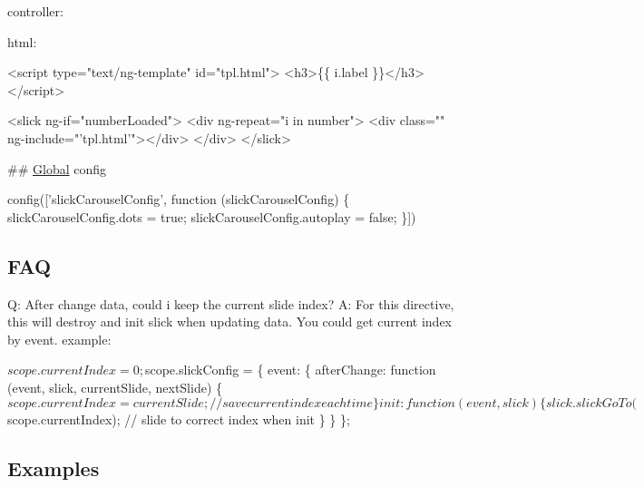 \begin{DoxyItemize}
\item controller\+: 

\item html\+: 
\begin{DoxyCode}
<script type="text/ng-template" id="tpl.html">
    <h3>\{\{ i.label \}\}</h3>
</script>

<slick ng-if="numberLoaded">
    <div ng-repeat="i in number">
        <div class="" ng-include="'tpl.html'"></div>
    </div>
</slick>
\end{DoxyCode}

\end{DoxyItemize}

\#\# \hyperlink{class_global}{Global} config 
\begin{DoxyCode}
config(['slickCarouselConfig', function (slickCarouselConfig) \{
    slickCarouselConfig.dots = true;
    slickCarouselConfig.autoplay = false;
\}])
\end{DoxyCode}


\subsection*{F\+AQ}

Q\+: After change data, could i keep the current slide index? A\+: For this directive, this will destroy and init slick when updating data. You could get current index by event. example\+: 
\begin{DoxyCode}
$scope.currentIndex = 0;
$scope.slickConfig = \{
    event: \{
        afterChange: function (event, slick, currentSlide, nextSlide) \{
          $scope.currentIndex = currentSlide; // save current index each time
        \}
        init: function (event, slick) \{
          slick.slickGoTo($scope.currentIndex); // slide to correct index when init
        \}
    \}
\};
\end{DoxyCode}


\subsection*{Examples}

